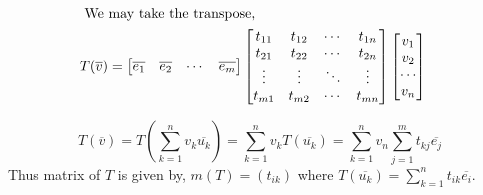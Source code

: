 \begin{commentary}
\begin{align*}
	\intertext{ We may take the transpose,}
	T(\overline{v}) & = \begin{bmatrix} \overline{e_1} & \overline{e_2} & \cdots & \overline{e_m} \end{bmatrix} \begin{bmatrix} t_{11} & t_{12} & \cdots & t_{1n} \\ t_{21} & t_{22} & \cdots & t_{2n} \\ \vdots & \vdots & \ddots & \vdots \\ t_{m1} & t_{m2} & \cdots & t_{mn} \end{bmatrix} \begin{bmatrix} v_1 \\ v_2 \\ \cdots \\ v_n  \end{bmatrix} 
\end{align*}
\end{commentary}
	\[ T(\overline{v}) = T \left( \sum_{k=1}^n v_k \overline{u_k} \right) = \sum_{k=1}^n v_k T(\overline{u_k}) = \sum_{k=1}^n v_n \sum_{j=1}^m t_{kj}\overline{e_j} \]
	Thus matrix of $T$ is given by, $m(T) = (t_{ik})$ where $T(\overline{u_k}) = \sum_{k=1}^n t_{ik}\overline{e_i}$.
